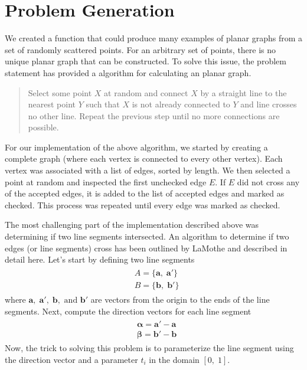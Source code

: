 \documentclass{article}
\newcommand{\ve}[1]{\boldsymbol{\mathbf{#1}}}
\begin{document}
\section{Problem Generation}
	We created a function that could produce many examples of planar graphs from a set of randomly scattered points. For an arbitrary set of points, there is no unique planar graph that can be constructed. To solve this issue, the problem statement has provided a algorithm for calculating an planar graph. 
	\begin{quote}
	Select some point $X$ at random and connect $X$ by a straight line
	to the nearest point $Y$ such that $X$ is not already connected to $Y$ and line crosses no other line. Repeat the
	previous step until no more connections are possible.
	\end{quote}
	For our implementation of the above algorithm, we started by creating a complete graph (where each vertex is connected to every other vertex). Each vertex was associated with a list of edges, sorted by length. 
	We then selected a point at random and inspected the first unchecked edge $E$. If $E$ did not cross any of the accepted edges, it is added to the list of accepted edges and marked as checked. This process was repeated until every edge was marked as checked. \par
	The most challenging part of the implementation described above was determining if two line segments intersected. An algorithm to determine if two edges (or line segments) cross has been outlined by LaMothe \cite{tricks} and described in detail here. Let's start by defining two line segments 
	\begin{align}
		\begin{split}
			& A = \{ \ve{a},\; \ve{a'} \} \\
			& B = \{\ve{b}, \;\ve{b'}\}
		\end{split}
	\end{align}
	where $\ve{a}, \; \ve{a'}, \; \ve{b}, \text{ and } \ve{b'}$ are vectors from the origin to the ends of the line segments. Next, compute the direction vectors for each line segment
	\begin{align}
		\begin{split}
			&\ve{\alpha} = \ve{a}' - \ve{a} \\
			&\ve{\beta} = \ve{b}' - \ve{b} 
		\end{split}
	\end{align}
	Now, the trick to solving this problem is to parameterize the line segment using the direction vector and a parameter $t_i$ in the domain $[0, \; 1]$.
\end{document}
